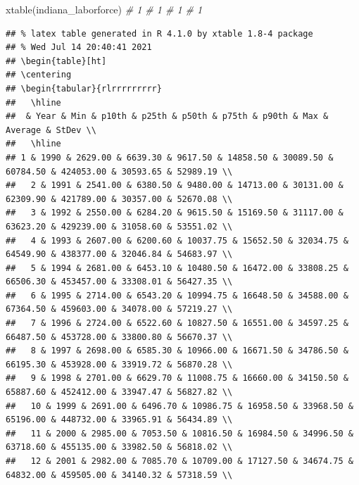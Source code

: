 \documentclass[
]{book}
\newenvironment{Shaded}{\begin{snugshade}}{\end{snugshade}}
\newcommand{\CommentTok}[1]{\textcolor[rgb]{0.56,0.35,0.01}{\textit{#1}}}
\newcommand{\FunctionTok}[1]{\textcolor[rgb]{0.00,0.00,0.00}{#1}}
\newcommand{\NormalTok}[1]{#1}
\begin{document}
\begin{Shaded}
\begin{Highlighting}[]
  \FunctionTok{xtable}\NormalTok{(indiana\_laborforce)  }\CommentTok{\# 1  \# 1  \# 1  \# 1}
\end{Highlighting}
\end{Shaded}

\begin{verbatim}
## % latex table generated in R 4.1.0 by xtable 1.8-4 package
## % Wed Jul 14 20:40:41 2021
## \begin{table}[ht]
## \centering
## \begin{tabular}{rlrrrrrrrrr}
##   \hline
##  & Year & Min & p10th & p25th & p50th & p75th & p90th & Max & Average & StDev \\ 
##   \hline
## 1 & 1990 & 2629.00 & 6639.30 & 9617.50 & 14858.50 & 30089.50 & 60784.50 & 424053.00 & 30593.65 & 52989.19 \\ 
##   2 & 1991 & 2541.00 & 6380.50 & 9480.00 & 14713.00 & 30131.00 & 62309.90 & 421789.00 & 30357.00 & 52670.08 \\ 
##   3 & 1992 & 2550.00 & 6284.20 & 9615.50 & 15169.50 & 31117.00 & 63623.20 & 429239.00 & 31058.60 & 53551.02 \\ 
##   4 & 1993 & 2607.00 & 6200.60 & 10037.75 & 15652.50 & 32034.75 & 64549.90 & 438377.00 & 32046.84 & 54683.97 \\ 
##   5 & 1994 & 2681.00 & 6453.10 & 10480.50 & 16472.00 & 33808.25 & 66506.30 & 453457.00 & 33308.01 & 56427.35 \\ 
##   6 & 1995 & 2714.00 & 6543.20 & 10994.75 & 16648.50 & 34588.00 & 67364.50 & 459603.00 & 34078.00 & 57219.27 \\ 
##   7 & 1996 & 2724.00 & 6522.60 & 10827.50 & 16551.00 & 34597.25 & 66487.50 & 453728.00 & 33800.80 & 56670.37 \\ 
##   8 & 1997 & 2698.00 & 6585.30 & 10966.00 & 16671.50 & 34786.50 & 66195.30 & 453928.00 & 33919.72 & 56870.28 \\ 
##   9 & 1998 & 2701.00 & 6629.70 & 11008.75 & 16660.00 & 34150.50 & 65887.60 & 452412.00 & 33947.47 & 56827.82 \\ 
##   10 & 1999 & 2691.00 & 6496.70 & 10986.75 & 16958.50 & 33968.50 & 65196.00 & 448732.00 & 33965.91 & 56434.89 \\ 
##   11 & 2000 & 2985.00 & 7053.50 & 10816.50 & 16984.50 & 34996.50 & 63718.60 & 455135.00 & 33982.50 & 56818.02 \\ 
##   12 & 2001 & 2982.00 & 7085.70 & 10709.00 & 17127.50 & 34674.75 & 64832.00 & 459505.00 & 34140.32 & 57318.59 \\ 

\end{verbatim}
\end{document}
